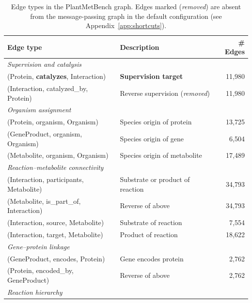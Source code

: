 \begin{table}[h]
\centering
\caption{Edge types in the PlantMetBench graph.
Edges marked (\emph{removed}) are absent from the message-passing graph in the
default configuration (see Appendix~\ref{app:shortcuts}).}
\label{tab:edge_types}
\begin{tabular}{llr}
\toprule
Edge type & Description & \# Edges \\
\midrule
\multicolumn{3}{l}{\textit{Supervision and catalysis}} \\
(Protein, \textbf{catalyzes}, Interaction)         & \textbf{Supervision target}                   & 11,980 \\
(Interaction, catalyzed\_by, Protein)              & Reverse supervision (\emph{removed})          & 11,980 \\
\midrule
\multicolumn{3}{l}{\textit{Organism assignment}} \\
(Protein, organism, Organism)                      & Species origin of protein                     & 13,725 \\
(GeneProduct, organism, Organism)                  & Species origin of gene                        & 6,504 \\
(Metabolite, organism, Organism)                   & Species origin of metabolite                  & 17,489 \\
\midrule
\multicolumn{3}{l}{\textit{Reaction–metabolite connectivity}} \\
(Interaction, participants, Metabolite)            & Substrate or product of reaction              & 34,793 \\
(Metabolite, is\_part\_of, Interaction)            & Reverse of above                              & 34,793 \\
(Interaction, source, Metabolite)                  & Substrate of reaction                         & 7,554 \\
(Interaction, target, Metabolite)                  & Product of reaction                           & 18,622 \\
\midrule
\multicolumn{3}{l}{\textit{Gene–protein linkage}} \\
(GeneProduct, encodes, Protein)                    & Gene encodes protein                          & 2,762 \\
(Protein, encoded\_by, GeneProduct)               & Reverse of above                              & 2,762 \\
\midrule
\multicolumn{3}{l}{\textit{Reaction hierarchy}} \\

\end{tabular}
\end{table}
